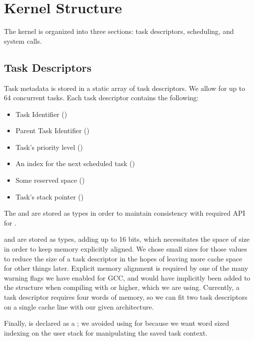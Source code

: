 \documentclass[pdftex,10pt,a4paper]{article}
\begin{document}
\newpage
\section*{Kernel Structure}

The kernel is organized into three sections: task descriptors,
scheduling, and system calls.

\subsection*{Task Descriptors}

Task metadata is stored in a static array of task descriptors. We
allow for up to 64 concurrent tasks. Each task descriptor contains the
following:

\begin{itemize}
  \item Task Identifier ()
  \item Parent Task Identifier ()
  \item Task's priority level ()
  \item An index for the next scheduled task ()
  \item Some reserved space ()
  \item Task's stack pointer ()
\end{itemize}

The  and  are stored as  types in order to
maintain consistency with required API for .

 and  are stored as  types,
adding up to 16 bits, which necessitates the  space of
size  in order to keep memory explicitly aligned. We
chose small sizes for those values to reduce the size of a task
descriptor in the hopes of leaving more cache space for other things
later. Explicit memory alignment is required by one of the many
warning flags we have enabled for GCC, and would have implicitly been
added to the structure when compiling with  or higher, which
we are using. Currently, a task descriptor requires four words of
memory, so we can fit two task descriptors on a single cache line with
our given architecture.

Finally,  is declared as a ; we avoided
using  for  because we want word sized indexing on
the user stack for manipulating the saved task context.
\end{document}
